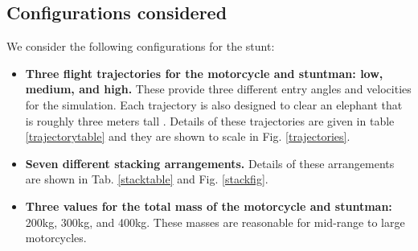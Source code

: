 \documentclass[12pt,a4paper,titlepage]{article}
\begin{document}
\subsection{Configurations considered}

We consider the following configurations for the stunt:

\begin{itemize}

\item {\bf Three flight trajectories for the motorcycle and stuntman: low, medium, and high.}
These provide three different entry angles and velocities for the simulation.  Each trajectory is also
designed to clear an elephant that is roughly three meters tall \cite{elephant_facts}.  Details of these
trajectories are given in table \ref{trajectorytable} and they are shown to scale in Fig. \ref{trajectories}.

\item {\bf Seven different stacking arrangements.}  Details of these arrangements are shown in
Tab. \ref{stacktable} and Fig. \ref{stackfig}.

\item {\bf Three values for the total mass of the motorcycle and stuntman:} 200kg, 300kg, and 400kg.
These masses are reasonable for mid-range to large motorcycles.

\end{itemize}
\end{document}
